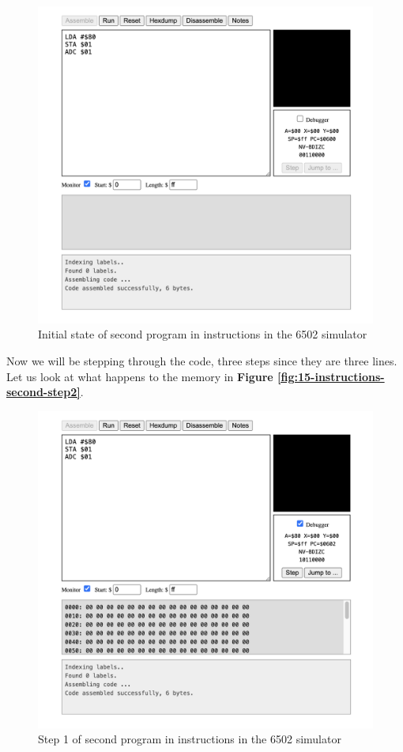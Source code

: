 \documentclass[a4paper]{article}
\begin{document}
\begin{figure}[H]
    \centering
    \includegraphics[width=1.0\textwidth]{res/images/q2/13-instructions-second-initial.png}
    \caption{Initial state of second program in instructions in the 6502 simulator}
    \label{fig:13-instructions-second-initial}
\end{figure}

Now we will be stepping through the code, three steps since they are three lines. Let us look at what happens to the memory in \textbf{Figure \ref{fig:15-instructions-second-step2}}.

\begin{figure}[H]
    \centering
    \includegraphics[width=1.0\textwidth]{res/images/q2/14-instructions-second-step1.png}
    \caption{Step 1 of second program in instructions in the 6502 simulator}
    \label{fig:14-instructions-second-step1}
\end{figure}
\end{document}
